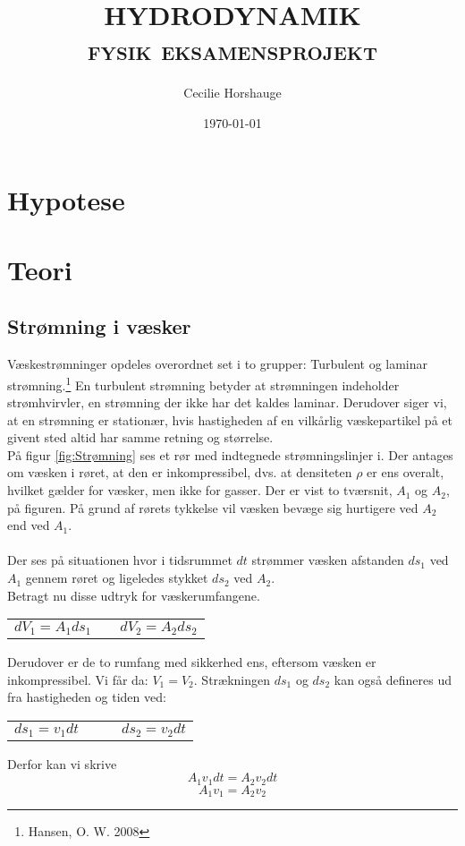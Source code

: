 \documentclass[a4paper, 11pt]{article}
\title{{\large \textsc{HYDRODYNAMIK\\fysik eksamensprojekt}}}
\author{Cecilie Horshauge}
\date{\today}
\begin{document}
\maketitle
\section{Hypotese}
\section{Teori}
\subsection{Strømning i væsker}
Væskestrømninger opdeles overordnet set i to grupper: Turbulent og laminar strømning.\footnote{Hansen, O. W. 2008}
En turbulent strømning betyder at strømningen indeholder strømhvirvler, en strømning der ikke har det kaldes laminar.
Derudover siger vi, at en strømning er stationær, hvis hastigheden af en vilkårlig væskepartikel på et givent sted altid har samme retning og størrelse.
\\
På figur \ref{fig:Strømning} ses et rør med indtegnede strømningslinjer i. Der antages om væsken i røret, at den er inkompressibel, 
dvs. at densiteten \(\rho\) er ens overalt, hvilket gælder for væsker, men ikke for gasser.
Der er vist to tværsnit, \(A_1\) og \(A_2\), på figuren. På grund af rørets tykkelse vil væsken bevæge sig hurtigere ved \(A_2\) end ved \(A_1\).\\\\
Der ses på situationen hvor i tidsrummet \(dt\) strømmer væsken afstanden \(ds_1\) ved \(A_1\) gennem røret og ligeledes stykket \(ds_2\) ved \(A_2\).\\
Betragt nu disse udtryk for væskerumfangene.
\begin{center}
    \begin{tabular}{ l c l }
     \(dV_1=A_1ds_1\) & & \(dV_2=A_2ds_2\)
    \end{tabular}
\end{center}
Derudover er de to rumfang med sikkerhed ens, eftersom væsken er inkompressibel. Vi får da: \(V_1 = V_2\). Strækningen \(ds_1\) og \(ds_2\) kan også defineres ud fra hastigheden og tiden ved:
\begin{center}
    \begin{tabular}{ l c c l }
     \(ds_1=v_1dt\) & & & \(ds_2=v_2dt\)
    \end{tabular}
\end{center}
Derfor kan vi skrive
\[A_1v_1dt = A_2v_2dt\]
\begin{equation}
    A_1v_1=A_2v_2
\end{equation}
\end{document}
